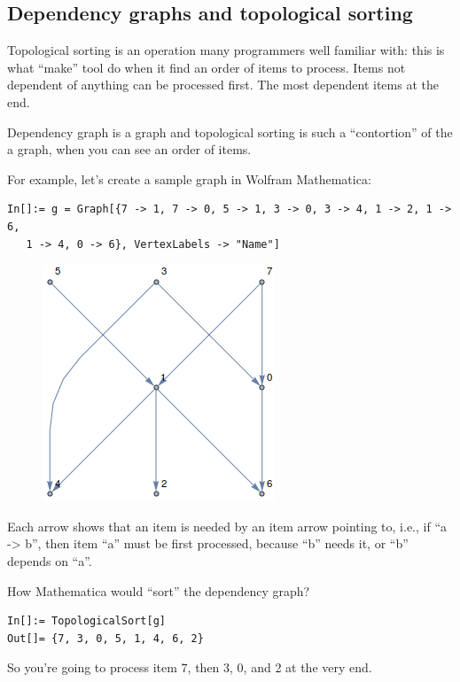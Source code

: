 \subsection{Dependency graphs and topological sorting}

Topological sorting is an operation many programmers well familiar with: this is what ``make'' tool
do when it find an order of items to process.
Items not dependent of anything can be processed first.
The most dependent items at the end.

Dependency graph is a graph and topological sorting is such a ``contortion'' of the a graph,
when you can see an order of items.

For example, let's create a sample graph in Wolfram Mathematica:

\begin{lstlisting}
In[]:= g = Graph[{7 -> 1, 7 -> 0, 5 -> 1, 3 -> 0, 3 -> 4, 1 -> 2, 1 -> 6, 
   1 -> 4, 0 -> 6}, VertexLabels -> "Name"]
\end{lstlisting}

\begin{figure}[H]
\centering
\includegraphics[scale=0.6]{SMT/tsort/math.png}
\caption{}
\end{figure}

Each arrow shows that an item is needed by an item arrow pointing to, i.e., if ``a -> b'', then item ``a'' must be first
processed, because ``b'' needs it, or ``b'' depends on ``a''.

How Mathematica would ``sort'' the dependency graph?

\begin{lstlisting}
In[]:= TopologicalSort[g]
Out[]= {7, 3, 0, 5, 1, 4, 6, 2}
\end{lstlisting}

So you're going to process item 7, then 3, 0, and 2 at the very end.

